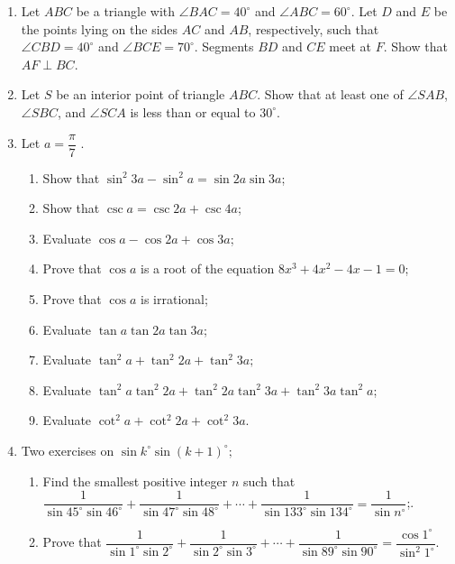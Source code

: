 \documentclass[12pt]{scrartcl}
\begin{document}
\begin{enumerate}
    \begin{enumerate}
        \item Prove that $T_{2n+1}(x)$ and $T_{2n}(x)$ are odd and even functions, respectively; 
        \item Prove that $T_{n}(\cos \theta)=\cos(n\theta)$ for all nonnegative integers $n$; 
        \item Prove that for real numbers $x$ in the interval $[-1, 1]$, $-1\le T_{n}(x)\le1$; 
        \item Prove that $T_{n+1}(x)>T_{n}(x)$ for real numbers $x$ with $x>1$; 
        \item Determine all the roots of $T_{n}(x)$; 
        \item Determine all the roots of $P_{n}(x)=T_{n}(x)-1$.
    \end{enumerate}
    \item Let $ABC$ be a triangle with $\angle BAC=40^{\circ}$ and $\angle ABC=60^{\circ}$. Let $D$ and $E$ be the points lying on the sides $AC$ and $AB$, respectively, such that $\angle CBD=40^{\circ}$ and $\angle BCE=70^{\circ}.$ Segments $BD$ and $CE$ meet at $F$. Show that $AF \perp BC$.
    \item Let $S$ be an interior point of triangle $ABC$. Show that at least one of $\angle SAB$, $\angle SBC$, and $\angle SCA$ is less than or equal to $30^{\circ}$.
    \item Let $a=\dfrac{\pi}{7}$ . 
    \begin{enumerate}
        \item Show that $\sin^{2}3a-\sin^{2}a=\sin 2a \sin 3a$; 
        \item Show that $\csc a=\csc 2a+\csc 4a$; 
        \item Evaluate $\cos a-\cos 2a+\cos 3a$; 
        \item Prove that $\cos a$ is a root of the equation $8x^{3}+4x^{2}-4x-1=0$; 
        \item Prove that $\cos a$ is irrational; 
        \item Evaluate $\tan a \tan 2a \tan 3a$; 
        \item Evaluate $\tan^{2}a+\tan^{2}2a+\tan^{2}3a;$ 
        \item Evaluate $\tan^{2}a \tan^{2}2a+\tan^{2}2a \tan^{2}3a+\tan^{2}3a \tan^{2}a$; 
        \item Evaluate $\cot^{2}a+\cot^{2}2a+\cot^{2}3a$.
    \end{enumerate}

    \item Two exercises on $\sin k^{\circ}\sin(k+1)^{\circ};$ 
    \begin{enumerate}
        \item Find the smallest positive integer $n$ such that $\dfrac{1}{\sin 45^{\circ}\sin 46^{\circ}}+\dfrac{1}{\sin 47^{\circ}\sin 48^{\circ}}+\cdots+\dfrac{1}{\sin 133^{\circ}\sin 134^{\circ}}=\dfrac{1}{\sin n^{\circ}}$;.
        \item Prove that $\dfrac{1}{\sin 1^{\circ}\sin 2^{\circ}}+\dfrac{1}{\sin 2^{\circ}\sin 3^{\circ}}+\cdots+\dfrac{1}{\sin 89^{\circ}\sin 90^{\circ}}=\dfrac{\cos 1^{\circ}}{\sin^{2}1^{\circ}}$.
    \end{enumerate}
    

\end{enumerate}
\end{document}
